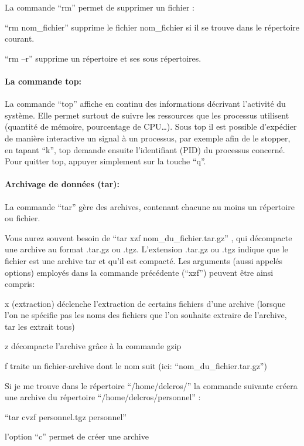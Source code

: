 \documentclass{article}
\begin{document}
    La commande ``rm'' permet de supprimer un fichier :

``rm nom\_fichier'' supprime le fichier nom\_fichier si il se trouve
dans le répertoire courant.

``rm --r'' supprime un répertoire et ses sous répertoires.

    \paragraph{La commande top:}\label{la-commande-top}

    La commande ``top'' affiche en continu des informations décrivant
l'activité du système. Elle permet surtout de suivre les ressources que
les processus utilisent (quantité de mémoire, pourcentage de
CPU\ldots{}). Sous top il est possible d'expédier de manière interactive
un signal à un processus, par exemple afin de le stopper, en tapant
``k'', top demande ensuite l'identifiant (PID) du processus concerné.
Pour quitter top, appuyer simplement sur la touche ``q''.

    \paragraph{Archivage de données
(tar):}\label{archivage-de-donnuxe9es-tar}

    La commande ``tar'' gère des archives, contenant chacune au moins un
répertoire ou fichier.

Vous aurez souvent besoin de ``tar xzf nom\_du\_fichier.tar.gz'' , qui
décompacte une archive au format .tar.gz ou .tgz. L'extension .tar.gz ou
.tgz indique que le fichier est une archive tar et qu'il est compacté.
Les arguments (aussi appelés options) employés dans la commande
précédente (``xzf'') peuvent être ainsi compris:

x (extraction) déclenche l'extraction de certains fichiers d'une archive
(lorsque l'on ne spécifie pas les noms des fichiers que l'on souhaite
extraire de l'archive, tar les extrait tous)

z décompacte l'archive grâce à la commande gzip

f traite un fichier-archive dont le nom suit (ici:
``nom\_du\_fichier.tar.gz'')

Si je me trouve dans le répertoire ``/home/delcros/'' la commande
suivante créera une archive du répertoire ``/home/delcros/personnel'' :

``tar cvzf personnel.tgz personnel''

l'option ``c'' permet de créer une archive
\end{document}
